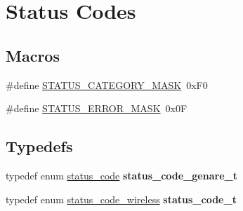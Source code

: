 \hypertarget{group__group__sam0__utils__status__codes}{}\section{Status Codes}
\label{group__group__sam0__utils__status__codes}
\subsection*{Macros}
\begin{DoxyCompactItemize}
\item 
\#define \hyperlink{group__group__sam0__utils__status__codes_ga5bf938a904077896054cd093bf7d8fa8}{S\+T\+A\+T\+U\+S\+\_\+\+C\+A\+T\+E\+G\+O\+R\+Y\+\_\+\+M\+A\+S\+K}~0x\+F0
\item 
\#define \hyperlink{group__group__sam0__utils__status__codes_ga4c46d8f176ca46ab775db0fe270d2f98}{S\+T\+A\+T\+U\+S\+\_\+\+E\+R\+R\+O\+R\+\_\+\+M\+A\+S\+K}~0x0\+F
\end{DoxyCompactItemize}
\subsection*{Typedefs}
\begin{DoxyCompactItemize}
\item 
\hypertarget{group__group__sam0__utils__status__codes_gac00c8566f7cf35542ab21a113933f485}{}typedef enum \hyperlink{group__group__sam0__utils__status__codes_ga751c892e5a46b8e7d282085a5a5bf151}{status\+\_\+code} {\bfseries status\+\_\+code\+\_\+genare\+\_\+t}\label{group__group__sam0__utils__status__codes_gac00c8566f7cf35542ab21a113933f485}

\item 
\hypertarget{group__group__sam0__utils__status__codes_ga68396b4d6dda8fc779819385588e4853}{}typedef enum \hyperlink{group__group__sam0__utils__status__codes_ga29235ed38b6f02861f29daae665ac3a2}{status\+\_\+code\+\_\+wireless} {\bfseries status\+\_\+code\+\_\+t}\label{group__group__sam0__utils__status__codes_ga68396b4d6dda8fc779819385588e4853}

\end{DoxyCompactItemize}
